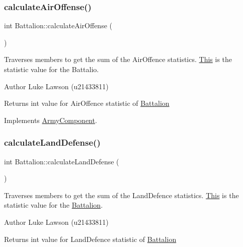 \subsubsection{\texorpdfstring{calculateAirOffense()}{calculateAirOffense()}}
{\footnotesize\ttfamily int Battalion\+::calculate\+Air\+Offense (\begin{DoxyParamCaption}{ }\end{DoxyParamCaption})\hspace{0.3cm}{\ttfamily [virtual]}}



Traverses members to get the sum of the Air\+Offence statistics. \mbox{\hyperlink{class_this}{This}} is the statistic value for the Battalio. 

\begin{DoxyAuthor}{Author}
Luke Lawson (u21433811) 
\end{DoxyAuthor}
\begin{DoxyReturn}{Returns}
int value for Air\+Offence statistic of \mbox{\hyperlink{class_battalion}{Battalion}} 
\end{DoxyReturn}


Implements \mbox{\hyperlink{class_army_component_aeea4bed9a4850e9b74f9306a8443085c}{Army\+Component}}.

\mbox{\label{class_battalion_a1285a61a5fa793a18bc8122a036d3ac3}} 
\subsubsection{\texorpdfstring{calculateLandDefense()}{calculateLandDefense()}}
{\footnotesize\ttfamily int Battalion\+::calculate\+Land\+Defense (\begin{DoxyParamCaption}{ }\end{DoxyParamCaption})\hspace{0.3cm}{\ttfamily [virtual]}}



Traverses members to get the sum of the Land\+Defence statistics. \mbox{\hyperlink{class_this}{This}} is the statistic value for the \mbox{\hyperlink{class_battalion}{Battalion}}. 

\begin{DoxyAuthor}{Author}
Luke Lawson (u21433811) 
\end{DoxyAuthor}
\begin{DoxyReturn}{Returns}
int value for Land\+Defence statistic of \mbox{\hyperlink{class_battalion}{Battalion}} 
\end{DoxyReturn}


